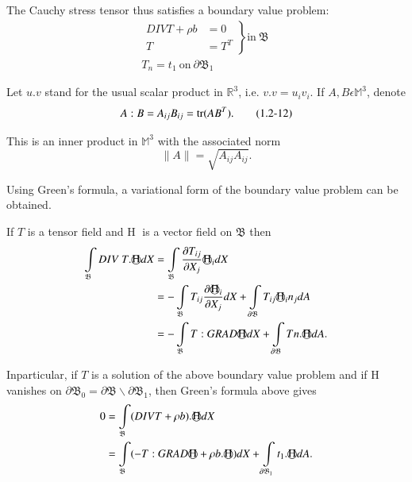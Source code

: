 The Cauchy stress tensor thus satisfies a boundary value problem:
\begin{align*}
  \left.
  \begin{aligned}
    DIV T + \rho b & = 0\\
    T & = T^T
  \end{aligned}
  \right\}
  \text{in} ~\mathfrak{B}~\\
    T_n = t_1 ~\text{on}~ \partial\mathfrak{B}_1
\end{align*}

Let $u.v$ stand for the usual scalar product in $\mathbb{R}^3$,
i.e. $v.v = u_i v_i$. If $A,B \epsilon \mathbb{M}^3$, denote 
\begin{equation*}
A : B = A_{ij} B_{ij} = \operatorname{tr} (AB^T).\tag{1.2-12}\label{eq1.2-12}
\end{equation*}

This is an inner product in $\mathbb{M}^3$ with the associated norm
\begin{equation*}
\| A \| = \sqrt{A_{ij} A_{ij}}.\tag{1.2-13}\label{eq1.2-13}
\end{equation*}

Using Green's formula, a variational form of the boundary value
problem can be obtained. 

If $T$ is a tensor field and \textcircled{H} is a vector field on
$\mathfrak{B}$ then 
\begin{align*}
\int\limits_{\mathfrak{B}} DIV~T.\text{\textcircled{H}} dX & =
\int\limits_{\mathfrak{B}} \frac{\partial T_{ij}}{\partial X_j}
\text{\textcircled{H}}_i dX\\ 
& = -\int\limits_{\mathfrak{B}} T_{ij} \frac{\partial
  \text{\textcircled{H}}_i}{\partial X_j} dX + \int\limits_{\partial
  \mathfrak{B}} T_{ij} \text{\textcircled{H}}_i n_j dA\\ 
& = -\int\limits_{\mathfrak{B}} T : GRAD \text{\textcircled{H}} dX +
\int\limits_{\partial \mathfrak{B}} Tn.\text{\textcircled{H}} dA. 
\end{align*}

In\pageoriginale  particular, if $T$ is a solution of the above boundary value
problem and if \textcircled{H} vanishes on $\partial \mathfrak{B}_0 =
\partial \mathfrak{B}\backslash \partial \mathfrak{B}_1$, then Green's
formula above gives 
\begin{align*}
  0 & = \int\limits_{\mathfrak{B}} (DIV T + \rho b). \text{\textcircled{H}}dX\\
  & = \int\limits_{\mathfrak{B}} (-T: GRAD \text{\textcircled{H}} + \rho
  b. \text{\textcircled{H}} )dX + \int\limits_{\partial \mathfrak{B}_1}
  t_1.\text{\textcircled{H}}dA. 
\end{align*}

